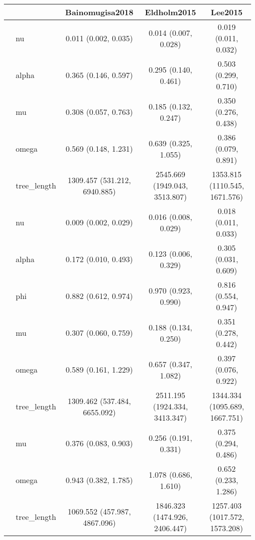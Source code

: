 \begingroup
\fontsize{5.2pt}{6.3pt}\selectfont
\begin{longtable}{l|l|ccc}
\toprule
\multicolumn{2}{c}{} & Bainomugisa2018 & Eldholm2015 & Lee2015 \\ 
\midrule\addlinespace[2.5pt]
\multirow{5}{=}{Beta} & nu & 0.011 (0.002, 0.035) & 0.014 (0.007, 0.028) & 0.019 (0.011, 0.032) \\ 
 & alpha & 0.365 (0.146, 0.597) & 0.295 (0.140, 0.461) & 0.503 (0.299, 0.710) \\ 
 & mu & 0.308 (0.057, 0.763) & 0.185 (0.132, 0.247) & 0.350 (0.276, 0.438) \\ 
 & omega & 0.569 (0.148, 1.231) & 0.639 (0.325, 1.055) & 0.386 (0.079, 0.891) \\ 
 & tree\_length & 1309.457 (531.212, 6940.885) & 2545.669 (1949.043, 3513.807) & 1353.815 (1110.545, 1671.576) \\ 
\midrule\addlinespace[2.5pt]
\multirow{6}{=}{Extended beta} & nu & 0.009 (0.002, 0.029) & 0.016 (0.008, 0.029) & 0.018 (0.011, 0.033) \\ 
 & alpha & 0.172 (0.010, 0.493) & 0.123 (0.006, 0.329) & 0.305 (0.031, 0.609) \\ 
 & phi & 0.882 (0.612, 0.974) & 0.970 (0.923, 0.990) & 0.816 (0.554, 0.947) \\ 
 & mu & 0.307 (0.060, 0.759) & 0.188 (0.134, 0.250) & 0.351 (0.278, 0.442) \\ 
 & omega & 0.589 (0.161, 1.229) & 0.657 (0.347, 1.082) & 0.397 (0.076, 0.922) \\ 
 & tree\_length & 1309.462 (537.484, 6655.092) & 2511.195 (1924.334, 3413.347) & 1344.334 (1095.689, 1667.751) \\ 
\midrule\addlinespace[2.5pt]
\multirow{3}{=}{Kingman} & mu & 0.376 (0.083, 0.903) & 0.256 (0.191, 0.331) & 0.375 (0.294, 0.486) \\ 
 & omega & 0.943 (0.382, 1.785) & 1.078 (0.686, 1.610) & 0.652 (0.233, 1.286) \\ 
 & tree\_length & 1069.552 (457.987, 4867.096) & 1846.323 (1474.926, 2406.447) & 1257.403 (1017.572, 1573.208) \\ 
\bottomrule
\end{longtable}
\endgroup

